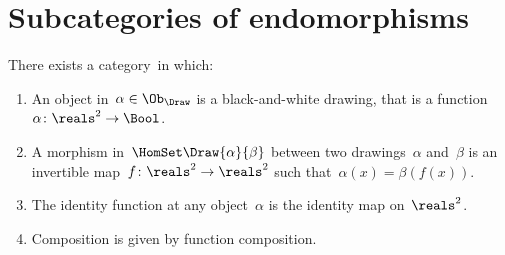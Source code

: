 
\section{Subcategories of endomorphisms}
\label{sec:Draw}


\index{\Draw}
\begin{definition}[Drawings]
    \label{def:Draw}
    There exists a category~\Draw in which:
    \begin{enumerate}
        \item An object in~$\alpha\in \Ob_\Draw$ is a black-and-white drawing,
              that is a function~$\alpha \colon \reals^2 \to \Bool$.
        \item A morphism in~$\HomSet\Draw{\alpha}{\beta}$ between two drawings~$\alpha$ and~$\beta$ is an invertible map~$f\colon \reals^2 \to \reals^2$ such that~$\alpha(x) = \beta(f(x))$.
        \item The identity function at any object~$\alpha$ is the identity map on~$\reals^2$.
        \item Composition is given by function composition.
    \end{enumerate}
\end{definition}

